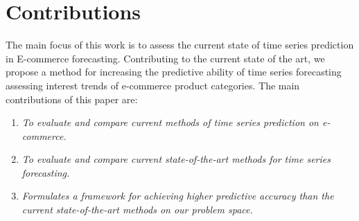 \section{Contributions}
\label{sections:Introduction:Contributions}

The main focus of this work is to assess the current state of time series prediction in E-commerce forecasting.
Contributing to the current state of the art,
we propose a method for increasing the predictive ability of time series forecasting
assessing interest trends of e-commerce product categories.
The main contributions of this paper are:

\begin{enumerate}
    \item {\it To evaluate and compare current methods of time series prediction on e-commerce.}
    \item {\it To evaluate and compare current state-of-the-art methods for time series forecasting.}
    \item {\it Formulates a framework for achieving higher predictive accuracy than the current state-of-the-art methods on our problem space.}
\end{enumerate}


\iffalse
The main description of the contributions will come in \Cref{cont} after the results are presented. This section just provides a brief summary of the main contributions of the work. This section can also be left out, leaving all discussions in \Cref{cont}.

The format of this section will generally follow the following format:
{\it
Donec non turpis nec neque egestas faucibus nec id neque. Etiam consectetur, odio vitae gravida tempus, diam velit sagittis turpis, a molestie ligula tellus at nunc. Nam convallis consequat vestibulum. Proin dolor neque, dapibus a pellentesque a, commodo a nibh.}

\begin{enumerate}
\item {\it Lorem ipsum dolor sit amet, consectetur adipiscing elit.}
\item {\it Lorem ipsum dolor sit amet, consectetur adipiscing elit.}
\item {\it Lorem ipsum dolor sit amet, consectetur adipiscing elit.}
\end{enumerate}
\fi
